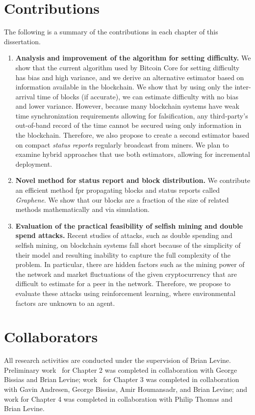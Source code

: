 \section*{Contributions}
The following is a summary of the contributions in each chapter of this dissertation. 
\begin{enumerate}
\item \textbf{Analysis and improvement of the algorithm for setting difficulty.} We show that the current algorithm used by Bitcoin Core for setting difficulty has bias and high variance, and we derive an alternative estimator based on information available in the blockchain. We show that by using only the inter-arrival time of blocks (if accurate), we can estimate difficulty with no bias and lower variance. However, because many blockchain systems have weak time synchronization requirements allowing for falsification, any third-party's out-of-band record of the time cannot be secured using only information in the blockchain. Therefore, we also propose to create a second estimator based on compact {\em status reports} regularly broadcast from miners. We plan to examine hybrid approaches that use both estimators, allowing for incremental deployment. 
\item \textbf{Novel method for status report and block distribution.} We contribute an efficient method fpr propagating blocks and status reports called \textit{Graphene}. We show that our blocks are a fraction of the size of related methods mathematically and via simulation.
\item \textbf{Evaluation of the practical feasibility of selfish mining and double spend attacks.} Recent studies of attacks, such as double spending and selfish mining, on blockchain systems fall short because of the simplicity of their model and resulting inability to capture the full complexity of the problem. In particular, there are hidden factors such as the mining power of the network and market fluctuations of the given cryptocurrency that are difficult to estimate for a peer in the network. Therefore, we propose to evaluate these attacks using reinforcement learning, where environmental factors are unknown to an agent.
\end{enumerate}

\section*{Collaborators}
All research activities are conducted under the supervision of Brian Levine. Preliminary work~\cite{Ozisik:2017c} for Chapter 2 was completed in collaboration with George Bissias and Brian Levine; work~\cite{Ozisik:2017} for Chapter 3 was completed in collaboration with Gavin Andresen, George Bissias, Amir Houmansadr, and Brian Levine; and work for Chapter 4 was completed in collaboration with Philip Thomas and Brian Levine.